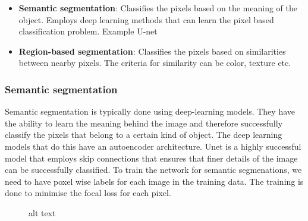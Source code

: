 \begin{itemize}
\tightlist
\item
  \textbf{Semantic segmentation}: Classifies the pixels based on the
  meaning of the object. Employs deep learning methods that can learn
  the pixel based classification problem. Example U-net
\item
  \textbf{Region-based segmentation}: Classifies the pixels based on
  similarities between nearby pixels. The criteria for similarity can be
  color, texture etc.
\end{itemize}

\subsubsection{Semantic segmentation}\label{semantic-segmentation}

Semantic segmentation is typically done using deep-learning models. They
have the ability to learn the meaning behind the image and therefore
successfully classify the pixels that belong to a certain kind of
object. The deep learning models that do this have an autoencoder
architecture. Unet is a highly successful model that employs skip
connections that ensures that finer details of the image can be
successfully classified. To train the network for semantic segmenations,
we need to have poxel wise labels for each image in the training data.
The training is done to minimise the focal loss for each pixel.

\begin{figure}
\centering
{}
\caption{alt text}
\end{figure}

